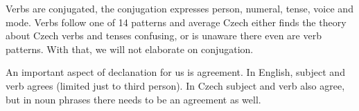 Verbs are conjugated, the conjugation expresses person, numeral, tense, voice and mode. Verbs follow one of 14 patterns and average Czech either finds the theory about Czech verbs and tenses confusing, or is unaware there even are verb patterns. With that, we will not elaborate on conjugation.

An important aspect of declanation for us is agreement. In English, subject and verb agrees (limited just to third person). In Czech subject and verb also agree, but in noun phrases there needs to be an agreement as well.  

